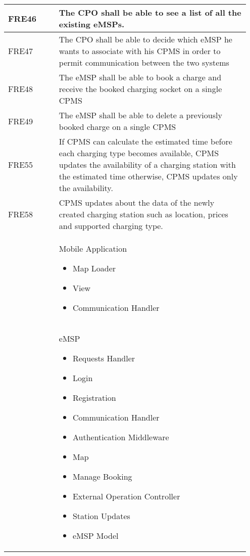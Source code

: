 {\begin{longtable}{|p{0.20\linewidth}p{0.75\linewidth}|}
    \hline
    \rowcolor{bluepoli!15} FRE46 & The CPO shall be able to see a list of all the existing eMSPs. \\
    \hline
    \rowcolor{bluepoli!15} FRE47 &  The CPO shall be able to decide which eMSP he wants to associate with his CPMS in order to permit communication between the two systems \\
    \hline
    \rowcolor{bluepoli!15} FRE48 & The eMSP shall be able to book a charge and receive the booked charging socket on a single CPMS \\
    \hline
    \rowcolor{bluepoli!15} FRE49 & The eMSP shall be able to delete a previously booked charge on a single CPMS\\
    \hline
    \rowcolor{bluepoli!15} FRE55 & If CPMS can calculate the estimated time before each charging type becomes available, CPMS updates the availability of a charging station with the estimated time otherwise, CPMS updates only the availability. \\
    \hline
    \rowcolor{bluepoli!15} FRE58 & CPMS updates about the data of the newly created charging station such as location, prices and supported charging type. \\
    \hline
    \rowcolor{bluepoli!5}  & Mobile Application  \newline
    \begin{itemize}
        \item Map Loader
        \item View
        \item Communication Handler
    \end{itemize} \\
    \hline
    \rowcolor{bluepoli!5}  & eMSP  \newline
    \begin{itemize}
        \item Requests Handler
        \item Login
        \item Registration
        \item Communication
        Handler
        \item Authentication Middleware
        \item Map
        \item Manage Booking
        \item External Operation Controller
        \item Station Updates
        \item eMSP Model
    \end{itemize} \\

\end{longtable}}

